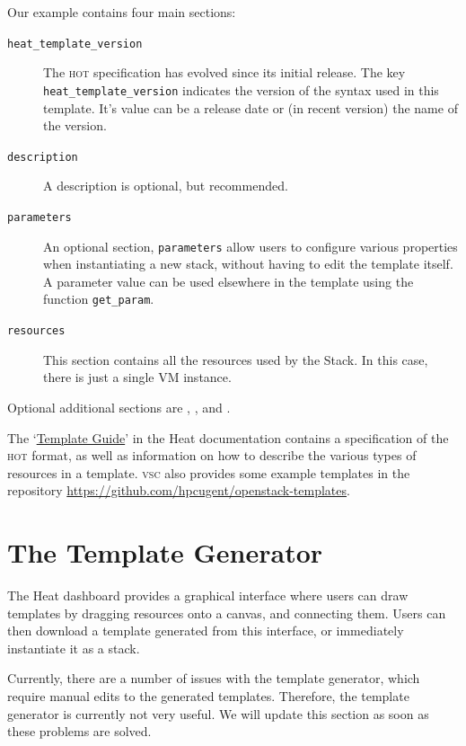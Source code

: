 Our example contains four main sections:
\begin{description}
\item[\texttt{heat\_template\_version}] The \textsc{hot} specification
  has evolved since its initial release.  The key
  \lstinline{heat_template_version} indicates the version of the
  syntax used in this template.  It's value can be a release date or
  (in recent version) the name of the version.
\item[\texttt{description}] A description is optional, but
  recommended.
\item[\texttt{parameters}] An optional section, \lstinline{parameters}
  allow users to configure various properties when instantiating a new
  stack, without having to edit the template itself.  A parameter
  value can be used elsewhere in the template using the function
  \lstinline{get_param}.
\item[\texttt{resources}] This section contains all the resources used
  by the Stack.  In this case, there is just a single VM instance.
\end{description}
Optional additional sections are ,
, and .

The
`\href{https://docs.openstack.org/heat/\osversion/template_guide}{Template
  Guide}' in the Heat documentation contains a specification of the
\textsc{hot} format, as well as information on how to describe the
various types of resources in a template.  \textsc{vsc} also provides
some example templates in the repository
\url{https://github.com/hpcugent/openstack-templates}.

\section{The Template Generator}\label{sec:template-generator}
The Heat dashboard provides a graphical interface where users can draw
templates by dragging resources onto a canvas, and connecting them.
Users can then download a template generated from this interface, or
immediately instantiate it as a stack.

 Currently, there are a number of issues with the
template generator, which require manual edits to the generated
templates.  Therefore, the template generator is currently not very
useful.  We will update this section as soon as these problems are
solved.

